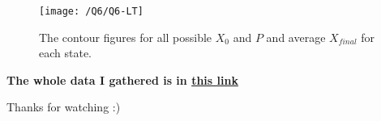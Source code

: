 \documentclass{article}
\begin{document}
    \begin{figure}[!htb]
        \centering
        \texttt{[image: /Q6/Q6-LT]}
        \label{fig:6.2}
        \caption{The contour figures for all possible $X_0$ and $P$ and average $X_{final}$ for each state.}
    \end{figure}

    \centering
    \textbf{The whole data I gathered is in \href{https://github.com/shahmari/ComputationalPhysics-Fall2021/tree/main/ProblemSet4/Data}{this link}}
    
    Thanks for watching :)
\end{document}
